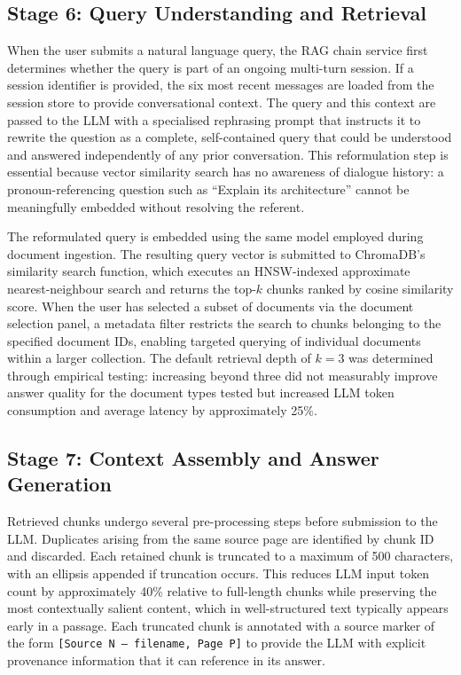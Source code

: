 \subsection{Stage 6: Query Understanding and Retrieval}

When the user submits a natural language query, the RAG chain service first determines whether the query is part of an ongoing multi-turn session. If a session identifier is provided, the six most recent messages are loaded from the session store to provide conversational context. The query and this context are passed to the LLM with a specialised rephrasing prompt that instructs it to rewrite the question as a complete, self-contained query that could be understood and answered independently of any prior conversation. This reformulation step is essential because vector similarity search has no awareness of dialogue history: a pronoun-referencing question such as ``Explain its architecture'' cannot be meaningfully embedded without resolving the referent.

The reformulated query is embedded using the same model employed during document ingestion. The resulting query vector is submitted to ChromaDB's similarity search function, which executes an HNSW-indexed approximate nearest-neighbour search and returns the top-$k$ chunks ranked by cosine similarity score. When the user has selected a subset of documents via the document selection panel, a metadata filter restricts the search to chunks belonging to the specified document IDs, enabling targeted querying of individual documents within a larger collection. The default retrieval depth of $k = 3$ was determined through empirical testing: increasing beyond three did not measurably improve answer quality for the document types tested but increased LLM token consumption and average latency by approximately 25\%.

\subsection{Stage 7: Context Assembly and Answer Generation}

Retrieved chunks undergo several pre-processing steps before submission to the LLM. Duplicates arising from the same source page are identified by chunk ID and discarded. Each retained chunk is truncated to a maximum of 500 characters, with an ellipsis appended if truncation occurs. This reduces LLM input token count by approximately 40\% relative to full-length chunks while preserving the most contextually salient content, which in well-structured text typically appears early in a passage. Each truncated chunk is annotated with a source marker of the form \texttt{[Source N --- filename, Page P]} to provide the LLM with explicit provenance information that it can reference in its answer.

